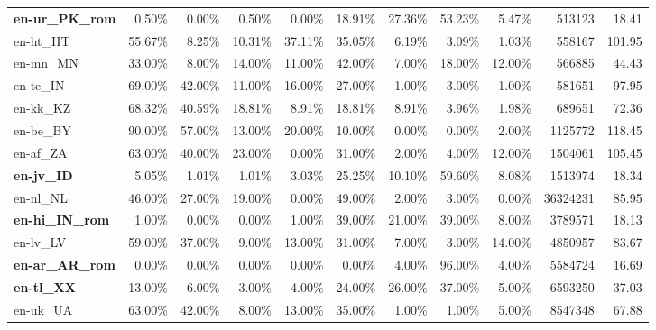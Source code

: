 \begin{table*}[hbt!]
{\begin{tabular}{l|rrrr|rrrr|rr}
            \textbf{en-ur\_PK\_rom} & 0.50\%  & 0.00\%  & 0.50\%  & 0.00\%  & 18.91\% & 27.36\% & 53.23\% & 5.47\%  & 513123      & 18.41             \\
            en-ht\_HT               & 55.67\% & 8.25\%  & 10.31\% & 37.11\% & 35.05\% & 6.19\%  & 3.09\%  & 1.03\%  & 558167      & 101.95            \\
            en-mn\_MN               & 33.00\% & 8.00\%  & 14.00\% & 11.00\% & 42.00\% & 7.00\%  & 18.00\% & 12.00\% & 566885      & 44.43             \\
            en-te\_IN               & 69.00\% & 42.00\% & 11.00\% & 16.00\% & 27.00\% & 1.00\%  & 3.00\%  & 1.00\%  & 581651      & 97.95             \\
            en-kk\_KZ               & 68.32\% & 40.59\% & 18.81\% & 8.91\%  & 18.81\% & 8.91\%  & 3.96\%  & 1.98\%  & 689651      & 72.36             \\
            en-be\_BY               & 90.00\% & 57.00\% & 13.00\% & 20.00\% & 10.00\% & 0.00\%  & 0.00\%  & 2.00\%  & 1125772     & 118.45            \\
            en-af\_ZA               & 63.00\% & 40.00\% & 23.00\% & 0.00\%  & 31.00\% & 2.00\%  & 4.00\%  & 12.00\% & 1504061     & 105.45            \\
            \textbf{en-jv\_ID}      & 5.05\%  & 1.01\%  & 1.01\%  & 3.03\%  & 25.25\% & 10.10\% & 59.60\% & 8.08\%  & 1513974     & 18.34             \\
            en-nl\_NL               & 46.00\% & 27.00\% & 19.00\% & 0.00\%  & 49.00\% & 2.00\%  & 3.00\%  & 0.00\%  & 36324231    & 85.95             \\
            \textbf{en-hi\_IN\_rom} & 1.00\%  & 0.00\%  & 0.00\%  & 1.00\%  & 39.00\% & 21.00\% & 39.00\% & 8.00\%  & 3789571     & 18.13             \\
            en-lv\_LV               & 59.00\% & 37.00\% & 9.00\%  & 13.00\% & 31.00\% & 7.00\%  & 3.00\%  & 14.00\% & 4850957     & 83.67             \\
            \textbf{en-ar\_AR\_rom} & 0.00\%  & 0.00\%  & 0.00\%  & 0.00\%  & 0.00\%  & 4.00\%  & 96.00\% & 4.00\%  & 5584724     & 16.69             \\
            \textbf{en-tl\_XX}      & 13.00\% & 6.00\%  & 3.00\%  & 4.00\%  & 24.00\% & 26.00\% & 37.00\% & 5.00\%  & 6593250     & 37.03             \\
            en-uk\_UA               & 63.00\% & 42.00\% & 8.00\%  & 13.00\% & 35.00\% & 1.00\%  & 1.00\%  & 5.00\%  & 8547348     & 67.88             \\

\end{tabular}}
\end{table*}
